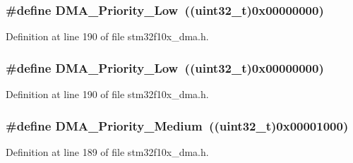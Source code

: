 \subsubsection[{\texorpdfstring{D\+M\+A\+\_\+\+Priority\+\_\+\+Low}{DMA_Priority_Low}}]{\setlength{\rightskip}{0pt plus 5cm}\#define D\+M\+A\+\_\+\+Priority\+\_\+\+Low~(({\bf uint32\+\_\+t})0x00000000)}\hypertarget{group___d_m_a__priority__level_gaf414e0aa8dd42aee6f83f88ab6175179}{}\label{group___d_m_a__priority__level_gaf414e0aa8dd42aee6f83f88ab6175179}


Definition at line 190 of file stm32f10x\+\_\+dma.\+h.

\subsubsection[{\texorpdfstring{D\+M\+A\+\_\+\+Priority\+\_\+\+Low}{DMA_Priority_Low}}]{\setlength{\rightskip}{0pt plus 5cm}\#define D\+M\+A\+\_\+\+Priority\+\_\+\+Low~(({\bf uint32\+\_\+t})0x00000000)}\hypertarget{group___d_m_a__priority__level_gaf414e0aa8dd42aee6f83f88ab6175179}{}\label{group___d_m_a__priority__level_gaf414e0aa8dd42aee6f83f88ab6175179}


Definition at line 190 of file stm32f10x\+\_\+dma.\+h.

\subsubsection[{\texorpdfstring{D\+M\+A\+\_\+\+Priority\+\_\+\+Medium}{DMA_Priority_Medium}}]{\setlength{\rightskip}{0pt plus 5cm}\#define D\+M\+A\+\_\+\+Priority\+\_\+\+Medium~(({\bf uint32\+\_\+t})0x00001000)}\hypertarget{group___d_m_a__priority__level_ga8e0d4a958f4288c6c759945789490f38}{}\label{group___d_m_a__priority__level_ga8e0d4a958f4288c6c759945789490f38}


Definition at line 189 of file stm32f10x\+\_\+dma.\+h.

